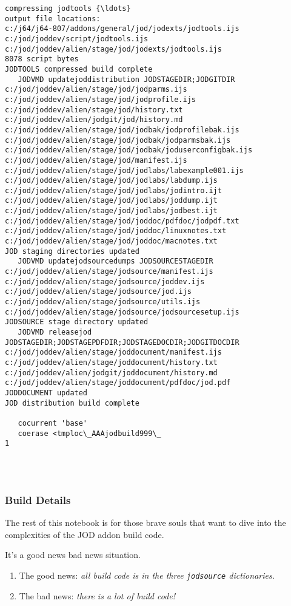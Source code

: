 \documentclass[11pt,letter,landscape]{article}
\begin{document}
\begin{Verbatim}[commandchars=\\\{\}]
compressing jodtools {\ldots}
output file locations:
c:/j64/j64-807/addons/general/jod/jodexts/jodtools.ijs
c:/jod/joddev/script/jodtools.ijs
c:/jod/joddev/alien/stage/jod/jodexts/jodtools.ijs
8078 script bytes
JODTOOLS compressed build complete
   JODVMD updatejoddistribution JODSTAGEDIR;JODGITDIR
c:/jod/joddev/alien/stage/jod/jodparms.ijs
c:/jod/joddev/alien/stage/jod/jodprofile.ijs
c:/jod/joddev/alien/stage/jod/history.txt
c:/jod/joddev/alien/jodgit/jod/history.md
c:/jod/joddev/alien/stage/jod/jodbak/jodprofilebak.ijs
c:/jod/joddev/alien/stage/jod/jodbak/jodparmsbak.ijs
c:/jod/joddev/alien/stage/jod/jodbak/joduserconfigbak.ijs
c:/jod/joddev/alien/stage/jod/manifest.ijs
c:/jod/joddev/alien/stage/jod/jodlabs/labexample001.ijs
c:/jod/joddev/alien/stage/jod/jodlabs/labdump.ijs
c:/jod/joddev/alien/stage/jod/jodlabs/jodintro.ijt
c:/jod/joddev/alien/stage/jod/jodlabs/joddump.ijt
c:/jod/joddev/alien/stage/jod/jodlabs/jodbest.ijt
c:/jod/joddev/alien/stage/jod/joddoc/pdfdoc/jodpdf.txt
c:/jod/joddev/alien/stage/jod/joddoc/linuxnotes.txt
c:/jod/joddev/alien/stage/jod/joddoc/macnotes.txt
JOD staging directories updated
   JODVMD updatejodsourcedumps JODSOURCESTAGEDIR
c:/jod/joddev/alien/stage/jodsource/manifest.ijs
c:/jod/joddev/alien/stage/jodsource/joddev.ijs
c:/jod/joddev/alien/stage/jodsource/jod.ijs
c:/jod/joddev/alien/stage/jodsource/utils.ijs
c:/jod/joddev/alien/stage/jodsource/jodsourcesetup.ijs
JODSOURCE stage directory updated
   JODVMD releasejod JODSTAGEDIR;JODSTAGEPDFDIR;JODSTAGEDOCDIR;JODGITDOCDIR
c:/jod/joddev/alien/stage/joddocument/manifest.ijs
c:/jod/joddev/alien/stage/joddocument/history.txt
c:/jod/joddev/alien/jodgit/joddocument/history.md
c:/jod/joddev/alien/stage/joddocument/pdfdoc/jod.pdf
JODDOCUMENT updated
JOD distribution build complete
   
   cocurrent 'base'
   coerase <tmploc\_AAAjodbuild999\_
1
   
   
   

    \end{Verbatim}

    \subsubsection{Build Details}\label{build-details}

The rest of this notebook is for those brave souls that want to dive
into the complexities of the JOD addon build code.

It's a good news bad news situation.

\begin{enumerate}
\def\labelenumi{\arabic{enumi}.}
\item
  The good news: \emph{all build code is in the three \texttt{jodsource}
  dictionaries.}
\item
  The bad news: \emph{there is a lot of build code!}
\end{enumerate}
\end{document}
